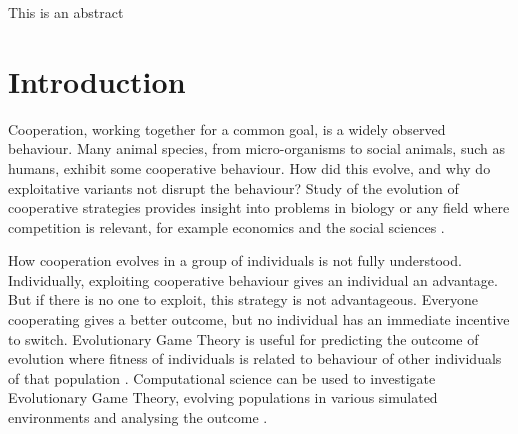 \documentclass[a4paper,11pt,bcshonoursthesis,singlespace,twoside]{cssethesis}
\begin{document}
\frontmatter					%

\thesistitlepage				%
\thesiscopyrightpage			%
\tableofcontents				%
\listoftables					%
\listoffigures					%

\begin{thesisabstract}			%
This is an abstract
\end{thesisabstract}                 

\thesisdeclarationpage			%


\mainmatter						%

\chapter{Introduction}
Cooperation, working together for a common goal, is a widely observed behaviour. 
Many animal species, from micro-organisms to social animals, such as humans, exhibit some cooperative behaviour. 
How did this evolve, and why do exploitative variants not disrupt the behaviour? 
Study of the evolution of cooperative strategies provides insight into problems in biology or any field where competition is relevant, for example economics and the social sciences \citep{Axelrod1997}. 

How cooperation evolves in a group of individuals is not fully understood. 
Individually, exploiting cooperative behaviour gives an individual an advantage. 
But if there is no one to exploit, this strategy is not advantageous. 
Everyone cooperating gives a better outcome, but no individual has an immediate incentive to switch. 
Evolutionary Game Theory is useful for predicting the outcome of evolution where fitness of individuals is related to behaviour of other individuals of that population \citep{maynard-smith:book:1982}. 
Computational science can be used to investigate Evolutionary Game Theory, evolving populations in various simulated environments and analysing the outcome \citep{fogel1993evolving}. 
\end{document}
